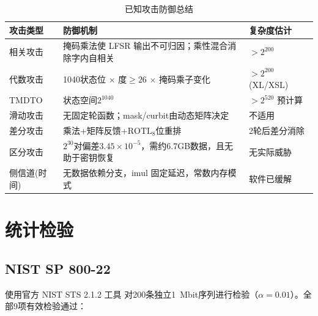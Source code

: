 \documentclass[11pt,a4paper]{ctexart}
\begin{document}
\begin{table}[H]
\centering
\begin{tabular}{@{}lll@{}}
\toprule
\textbf{攻击类型} & \textbf{防御机制} & \textbf{复杂度估计} \\
\midrule
相关攻击 \cite{golic}  & 掩码乘法使 LFSR 输出不可归因；乘性混合消除字内自相关 & $>2^{200}$ \\
代数攻击 \cite{courtois} & 1040状态位 $\times$ 度$\ge 26$ $\times$ 掩码乘子变化 & $>2^{200}$ (XL/XSL) \\
TMDTO \cite{babbage}    & 状态空间$2^{1040}$ & $>2^{520}$ 预计算 \\
滑动攻击   & 无固定轮函数；mask/curbit由动态矩阵决定 & 不适用 \\
差分攻击   & 乘法+矩阵反馈+$\mathrm{ROTL}_8$位重排 & 2轮后差分消除 \\
区分攻击   & $2^{30}$对偏差$3.45\times10^{-5}$，需约6.7GB数据，且无助于密钥恢复 & 无实际威胁 \\
侧信道(时间) & 无数据依赖分支，imul 固定延迟，常数内存模式 & 软件已缓解 \\
\bottomrule
\end{tabular}
\caption{已知攻击防御总结}
\label{tab:attacks}
\end{table}

\clearpage
\section{统计检验}

\subsection{NIST SP 800-22}

使用官方 NIST STS 2.1.2 工具 \cite{nist} 对200条独立1~Mbit序列进行检验（$\alpha = 0.01$）。全部9项有效检验通过：
\end{document}
